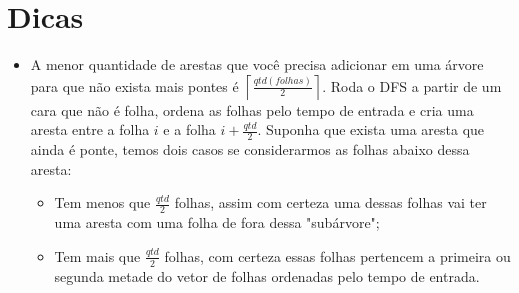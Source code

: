     \section{Dicas}
    \begin{itemize}
    \item A menor quantidade de arestas que você precisa adicionar em uma árvore para que não exista mais pontes é $\left \lceil \frac{qtd(folhas)}{2} \right \rceil$. Roda o DFS a partir de um cara que não é folha, ordena as folhas pelo tempo de entrada e cria uma aresta entre a folha $i$ e a folha $i + \frac{qtd}{2}$. Suponha que exista uma aresta que ainda é ponte, temos dois casos se considerarmos as folhas abaixo dessa aresta:
        \begin{itemize}
        \item Tem menos que $\frac{qtd}{2}$ folhas, assim com certeza uma dessas folhas vai ter uma aresta com uma folha de fora dessa "subárvore";
        \item Tem mais que $\frac{qtd}{2}$ folhas, com certeza essas folhas pertencem a primeira ou segunda metade do vetor de folhas ordenadas pelo tempo de entrada.
        \end{itemize}
    \end{itemize}
